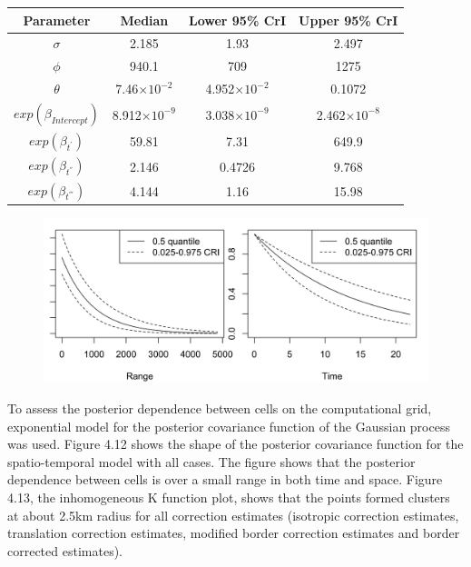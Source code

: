 \documentclass[12pt,a4paper]{report}
\begin{document}
\begin{table}[h]
    \centering
    \begin{tabular}{cccc}
    \toprule
         Parameter & Median & Lower 95\%  CrI & Upper 95\%  CrI\\ \midrule
        $\sigma$ & 2.185 & 1.93 & 2.497 \\
        $\phi$ & 940.1 & 709 & 1275 \\
        $\theta$ & 7.46$\times10^{-2}$ & 4.952$\times10^{-2}$ & 0.1072 \\
        $exp(\beta_{Intercept})$ & 8.912$\times10^{-9}$ & 3.038$\times10^{-9}$ & 2.462$\times10^{-8}$ \\
        $exp(\beta_{t^{'}})$ & 59.81 & 7.31 & 649.9 \\
        $exp(\beta_{t^{''}})$ & 2.146 & 0.4726 & 9.768 \\
        $exp(\beta_{t^{'''}})$ & 4.144 & 1.16 & 15.98 \\
        \bottomrule
    \end{tabular}
\end{table}

\begin{figure}[H]
\begin{center}
\includegraphics[width=\linewidth]{Posterior Covariance Function - All Cases.png}
\end{center}
\end{figure}

To assess the posterior dependence between cells on the computational grid,   exponential model for the posterior covariance function of the Gaussian process was used. Figure 4.12 shows the shape of the posterior covariance function for the spatio-temporal model with all cases. The figure shows that the posterior dependence between cells is over a small range in both time and space. Figure 4.13, the inhomogeneous K function plot, shows that the points formed clusters at about 2.5km radius for all correction estimates (isotropic correction estimates, translation correction estimates, modified border correction estimates and border corrected estimates).\\
\end{document}
